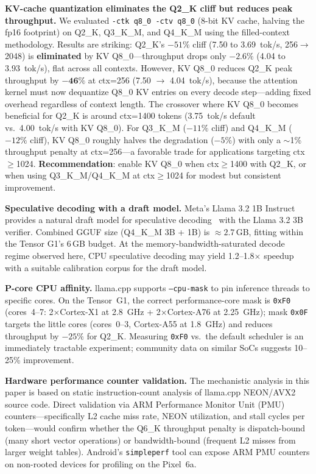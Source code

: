\documentclass[conference]{IEEEtran}
\begin{document}
\textbf{KV-cache quantization eliminates the Q2\_K cliff but reduces peak throughput.}
We evaluated \texttt{-ctk q8\_0 -ctv q8\_0} (8-bit KV cache, halving the fp16 footprint)
on Q2\_K, Q3\_K\_M, and Q4\_K\_M using the filled-context methodology.
Results are striking: Q2\_K's $-51\%$ cliff (7.50 to 3.69~tok/s, 256$\to$2048) is
\textbf{eliminated} by KV Q8\_0---throughput drops only $-2.6\%$ (4.04 to 3.93~tok/s),
flat across all contexts.
However, KV Q8\_0 reduces Q2\_K peak throughput by $\mathbf{-46\%}$ at ctx=256
(7.50 $\to$ 4.04~tok/s), because the attention kernel must now dequantize Q8\_0 KV
entries on every decode step---adding fixed overhead regardless of context length.
The crossover where KV Q8\_0 becomes beneficial for Q2\_K is around ctx=1400 tokens
(3.75~tok/s default vs.\ 4.00~tok/s with KV Q8\_0).
For Q3\_K\_M ($-11\%$ cliff) and Q4\_K\_M ($-12\%$ cliff), KV Q8\_0 roughly halves
the degradation ($-5\%$) with only a $\sim$1\% throughput penalty at ctx=256---a
favorable trade for applications targeting ctx$\geq$1024.
\textbf{Recommendation}: enable KV Q8\_0 when ctx$\geq$1400 with Q2\_K, or when
using Q3\_K\_M/Q4\_K\_M at ctx$\geq$1024 for modest but consistent improvement.

\textbf{Speculative decoding with a draft model.} Meta's Llama 3.2 1B Instruct
provides a natural draft model for speculative decoding~\cite{leviathan_speculative}
with the Llama 3.2 3B verifier. Combined GGUF size (Q4\_K\_M 3B + 1B) is ${\approx}2.7$\,GB,
fitting within the Tensor G1's 6\,GB budget. At the memory-bandwidth-saturated
decode regime observed here, CPU speculative decoding may yield 1.2--1.8$\times$
speedup with a suitable calibration corpus for the draft model.

\textbf{P-core CPU affinity.}
llama.cpp supports \texttt{--cpu-mask} to pin inference threads to specific cores.
On the Tensor~G1, the correct performance-core mask is \texttt{0xF0}
(cores~4--7: 2$\times$Cortex-X1 at 2.8~GHz + 2$\times$Cortex-A76 at 2.25~GHz);
mask \texttt{0x0F} targets the little cores (cores~0--3, Cortex-A55 at 1.8~GHz)
and reduces throughput by $-25\%$ for Q2\_K.
Measuring \texttt{0xF0} vs.\ the default scheduler is an immediately tractable
experiment; community data on similar SoCs suggests 10--25\% improvement.

\textbf{Hardware performance counter validation.}
The mechanistic analysis in this paper is based on static instruction-count
analysis of llama.cpp NEON/AVX2 source code.
Direct validation via ARM Performance Monitor Unit (PMU) counters---specifically
L2 cache miss rate, NEON utilization, and stall cycles per token---would
confirm whether the Q6\_K throughput penalty is dispatch-bound (many short
vector operations) or bandwidth-bound (frequent L2 misses from larger weight
tables).
Android's \texttt{simpleperf} tool can expose ARM PMU counters on non-rooted
devices for profiling on the Pixel~6a.
\end{document}
